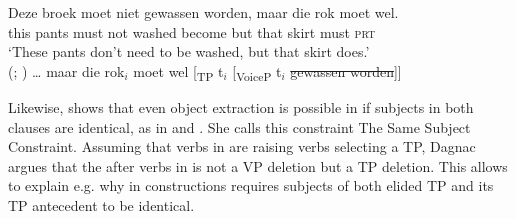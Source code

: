 \documentclass[output=paper,colorlinks,citecolor=brown,]{langsci/langscibook}
\begin{document}
\begin{exe}
\ex
\begin{xlist}
\end{xlist}
\ex  \label{7}
\begin{xlist}
\ex
\gll Deze broek moet niet gewassen worden, maar die rok moet wel.\\
this pants must not  washed become but that skirt must \textsc{prt} \\
\glt  `These pants don't need to be washed, but that skirt does.' \\ \hfill (; \citealt{Aelbrecht2010})
\ex
{\ldots} maar die rok$_{i}$ moet wel [\textsubscript{TP} t$_{i}$ [\textsubscript{VoiceP} t$_{i}$ \sout{gewassen worden}]]
\end{xlist}
\end{exe}

\noindent Likewise, \cite{Dagnac2010} shows that even object extraction is possible in  if subjects in both clauses are identical, as in  and . She calls this constraint The Same Subject Constraint. Assuming that  verbs in  are raising verbs selecting a TP, Dagnac argues that the  after  verbs in  is not a VP deletion but a TP deletion. This allows to explain e.g. why  in  constructions requires subjects of both elided TP and its TP antecedent to be identical.
\end{document}
